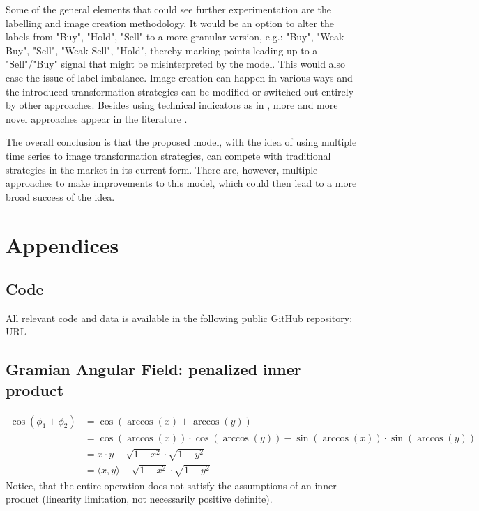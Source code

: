 \documentclass[12pt, a4paper]{article}
\begin{document}
Some of the general elements that could see further experimentation are the labelling and image creation methodology. It would be an option to alter the labels from "Buy", "Hold", "Sell" to a more granular version, e.g.: "Buy", "Weak-Buy", "Sell", "Weak-Sell", "Hold", thereby marking points leading up to a "Sell"/"Buy" signal that might be misinterpreted by the model. This would also ease the issue of label imbalance. Image creation can happen in various ways and the introduced transformation strategies can be modified or switched out entirely by other approaches. Besides using technical indicators as in \cite{sezer2018algorithmic}, more and more novel approaches appear in the literature \cite{sezer2019financial}.

The overall conclusion is that the proposed model, with the idea of using multiple time series to image transformation strategies, can compete with traditional strategies in the market in its current form. There are, however, multiple approaches to make improvements to this model, which could then lead to a more broad success of the idea.

\newpage
\section{Appendices}
\label{sec:App}

\subsection{Code}
\label{app:GIT}
All relevant code and data is available in the following public GitHub repository: URL

\subsection{Gramian Angular Field: penalized inner product}
\label{app:GAF}
\begin{equation}
    \begin{split}
        \cos(\phi_1 + \phi_2)  & = \cos(\arccos(x) + \arccos(y)) \\
        & = \cos(\arccos(x)) \cdot \cos(\arccos(y)) - \sin(\arccos(x)) \cdot \sin(\arccos(y))\\
        & = x\cdot y - \sqrt{1-x^2} \cdot \sqrt{1-y^2}\\
        & = \langle x, y \rangle - \sqrt{1-x^2} \cdot \sqrt{1-y^2}
    \end{split}
\end{equation}
 Notice, that the entire operation does not satisfy the assumptions of an inner product (linearity limitation, not necessarily positive definite).
\end{document}
